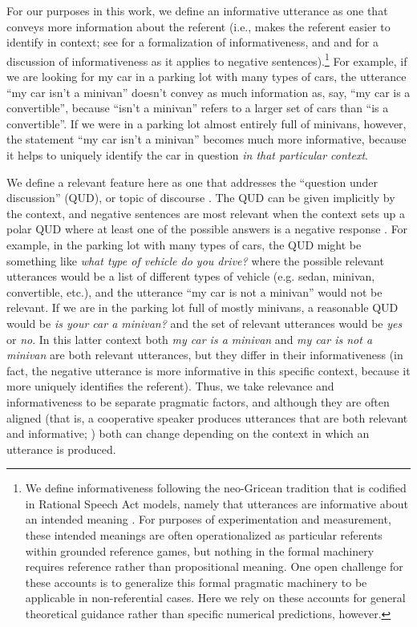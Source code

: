 \documentclass[man, floatsintext, noapacite]{apa6}
\begin{document}
For our purposes in this work, we define an informative utterance as one that conveys more information about the referent (i.e., makes the referent easier to identify in context; see  for a formalization of informativeness, and  and  for a discussion of informativeness as it applies to negative sentences).\footnote{We define informativeness following the neo-Gricean tradition that is codified in Rational Speech Act models, namely that utterances are informative about an intended meaning \cite{goodman2016, frank2012}. For purposes of experimentation and measurement, these intended meanings are often operationalized as particular referents within grounded reference games, but nothing in the formal machinery requires reference rather than propositional meaning. One open challenge for these accounts is to generalize this formal pragmatic machinery to be applicable in non-referential cases. Here we rely on these accounts for general theoretical guidance rather than specific numerical predictions, however.}  For example, if we are looking for my car in a parking lot with many types of cars, the utterance ``my car isn't a minivan'' doesn't convey as much information as, say, ``my car is a convertible'', because ``isn't a minivan'' refers to a larger set of cars than ``is a convertible''. If we were in a parking lot almost entirely full of minivans, however, the statement ``my car isn't a minivan'' becomes much more informative, because it helps to uniquely identify the car in question \textit{in that particular context}.

We define a relevant feature here as one that addresses the ``question under discussion'' (QUD), or topic of discourse \cite{roberts2012, vanrooy2003}. The QUD can be given implicitly by the context, and negative sentences are most relevant when the context sets up a polar QUD where at least one of the possible answers is a negative response \cite{xiang2020}. For example, in the parking lot with many types of cars, the QUD might be something like \textit{what type of vehicle do you drive?} where the possible relevant utterances would be a list of different types of vehicle (e.g. sedan, minivan, convertible, etc.), and the utterance ``my car is not a minivan'' would not be relevant. If we are in the parking lot full of mostly minivans, a reasonable QUD would be \textit{is your car a minivan?} and the set of relevant utterances would be \textit{yes} or \textit{no}. In this latter context both \textit{my car is a minivan} and \textit{my car is not a minivan} are both relevant utterances, but they differ in their informativeness (in fact, the negative utterance is more informative in this specific context, because it more uniquely identifies the referent). Thus, we take relevance and informativeness to be separate pragmatic factors, and although they are often aligned (that is, a cooperative speaker produces utterances that are both relevant and informative; ) both can change depending on the context in which an utterance is produced.
\end{document}

